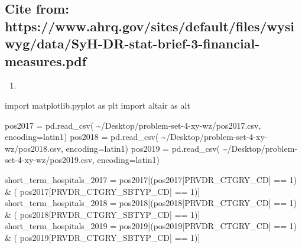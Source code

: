 \documentclass[
  letterpaper,
  DIV=11,
  numbers=noendperiod]{scrartcl}
\newenvironment{Shaded}{\begin{snugshade}}{\end{snugshade}}
\newcommand{\DecValTok}[1]{\textcolor[rgb]{0.68,0.00,0.00}{#1}}
\newcommand{\ImportTok}[1]{\textcolor[rgb]{0.00,0.46,0.62}{#1}}
\newcommand{\NormalTok}[1]{\textcolor[rgb]{0.00,0.23,0.31}{#1}}
\newcommand{\OperatorTok}[1]{\textcolor[rgb]{0.37,0.37,0.37}{#1}}
\newcommand{\StringTok}[1]{\textcolor[rgb]{0.13,0.47,0.30}{#1}}
\providecommand{\tightlist}{%
  \setlength{\itemsep}{0pt}\setlength{\parskip}{0pt}}\usepackage{longtable,booktabs,array}
\begin{document}
\subsection{Cite from:
https://www.ahrq.gov/sites/default/files/wysiwyg/data/SyH-DR-stat-brief-3-financial-measures.pdf}\label{cite-from-httpswww.ahrq.govsitesdefaultfileswysiwygdatasyh-dr-stat-brief-3-financial-measures.pdf}

\begin{enumerate}
\def\labelenumi{\arabic{enumi}.}
\setcounter{enumi}{2}
\tightlist
\item
\end{enumerate}

\begin{Shaded}
\begin{Highlighting}[]
\ImportTok{import}\NormalTok{ matplotlib.pyplot }\ImportTok{as}\NormalTok{ plt}
\ImportTok{import}\NormalTok{ altair }\ImportTok{as}\NormalTok{ alt}

\NormalTok{pos2017 }\OperatorTok{=}\NormalTok{ pd.read\_csv(}
    \StringTok{\textquotesingle{}\textasciitilde{}/Desktop/problem{-}set{-}4{-}xy{-}wz/pos2017.csv\textquotesingle{}}\NormalTok{, encoding}\OperatorTok{=}\StringTok{\textquotesingle{}latin1\textquotesingle{}}\NormalTok{)}
\NormalTok{pos2018 }\OperatorTok{=}\NormalTok{ pd.read\_csv(}
    \StringTok{\textquotesingle{}\textasciitilde{}/Desktop/problem{-}set{-}4{-}xy{-}wz/pos2018.csv\textquotesingle{}}\NormalTok{, encoding}\OperatorTok{=}\StringTok{\textquotesingle{}latin1\textquotesingle{}}\NormalTok{)}
\NormalTok{pos2019 }\OperatorTok{=}\NormalTok{ pd.read\_csv(}
    \StringTok{\textquotesingle{}\textasciitilde{}/Desktop/problem{-}set{-}4{-}xy{-}wz/pos2019.csv\textquotesingle{}}\NormalTok{, encoding}\OperatorTok{=}\StringTok{\textquotesingle{}latin1\textquotesingle{}}\NormalTok{)}

\NormalTok{short\_term\_hospitals\_2017 }\OperatorTok{=}\NormalTok{ pos2017[(pos2017[}\StringTok{\textquotesingle{}PRVDR\_CTGRY\_CD\textquotesingle{}}\NormalTok{] }\OperatorTok{==} \DecValTok{1}\NormalTok{) }\OperatorTok{\&}\NormalTok{ (}
\NormalTok{    pos2017[}\StringTok{\textquotesingle{}PRVDR\_CTGRY\_SBTYP\_CD\textquotesingle{}}\NormalTok{] }\OperatorTok{==} \DecValTok{1}\NormalTok{)]}
\NormalTok{short\_term\_hospitals\_2018 }\OperatorTok{=}\NormalTok{ pos2018[(pos2018[}\StringTok{\textquotesingle{}PRVDR\_CTGRY\_CD\textquotesingle{}}\NormalTok{] }\OperatorTok{==} \DecValTok{1}\NormalTok{) }\OperatorTok{\&}\NormalTok{ (}
\NormalTok{    pos2018[}\StringTok{\textquotesingle{}PRVDR\_CTGRY\_SBTYP\_CD\textquotesingle{}}\NormalTok{] }\OperatorTok{==} \DecValTok{1}\NormalTok{)]}
\NormalTok{short\_term\_hospitals\_2019 }\OperatorTok{=}\NormalTok{ pos2019[(pos2019[}\StringTok{\textquotesingle{}PRVDR\_CTGRY\_CD\textquotesingle{}}\NormalTok{] }\OperatorTok{==} \DecValTok{1}\NormalTok{) }\OperatorTok{\&}\NormalTok{ (}
\NormalTok{    pos2019[}\StringTok{\textquotesingle{}PRVDR\_CTGRY\_SBTYP\_CD\textquotesingle{}}\NormalTok{] }\OperatorTok{==} \DecValTok{1}\NormalTok{)]}


\end{Highlighting}
\end{Shaded}
\end{document}
